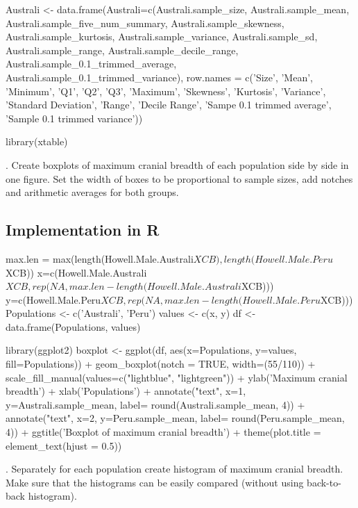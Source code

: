 \documentclass[12pt, oneside]{report}\usepackage[]{graphicx}\usepackage[]{color}
\begin{document}
\begin{Schunk}
\begin{Sinput}
Australi <- data.frame(Australi=c(Australi.sample_size, Australi.sample_mean, Australi.sample_five_num_summary, Australi.sample_skewness, 
                        Australi.sample_kurtosis, Australi.sample_variance, Australi.sample_sd, Australi.sample_range,
                        Australi.sample_decile_range, Australi.sample_0.1_trimmed_average, Australi.sample_0.1_trimmed_variance),
                       row.names = c('Size', 'Mean', 'Minimum', 'Q1', 'Q2', 'Q3', 'Maximum', 'Skewness', 'Kurtosis', 'Variance',
                        'Standard Deviation', 'Range', 'Decile Range', 'Sampe 0.1 trimmed average', 'Sample 0.1 trimmed variance'))

library(xtable)
\end{Sinput}
\end{Schunk}

. Create boxplots of maximum cranial breadth of each population side by side in one figure. Set the width of boxes to be proportional to sample sizes, add notches and arithmetic averages for both groups.

\subsection*{Implementation in R}
\begin{Schunk}
\begin{Sinput}
max.len = max(length(Howell.Male.Australi$XCB), length(Howell.Male.Peru$XCB))
x=c(Howell.Male.Australi$XCB, rep(NA, max.len - length(Howell.Male.Australi$XCB)))
y=c(Howell.Male.Peru$XCB, rep(NA, max.len - length(Howell.Male.Peru$XCB)))
Populations <- c('Australi', 'Peru')
values <- c(x, y)
df <- data.frame(Populations, values)

library(ggplot2)
boxplot <- ggplot(df, aes(x=Populations, y=values, fill=Populations)) +
          geom_boxplot(notch = TRUE, width=(55/110)) +
          scale_fill_manual(values=c("lightblue", "lightgreen")) +
          ylab('Maximum cranial breadth') +
          xlab('Populations') +
          annotate("text", x=1, y=Australi.sample_mean, label= round(Australi.sample_mean, 4)) +
          annotate("text", x=2, y=Peru.sample_mean, label= round(Peru.sample_mean, 4)) +
          ggtitle('Boxplot of maximum cranial breadth') +
          theme(plot.title = element_text(hjust = 0.5))
\end{Sinput}
\end{Schunk}

. Separately for each population create histogram of maximum cranial breadth. Make sure that the histograms can be easily compared (without using back-to-back histogram).
\end{document}
